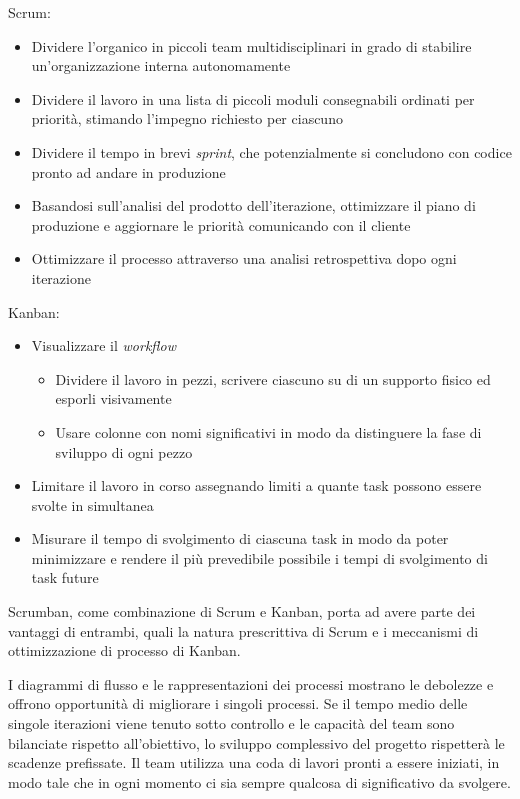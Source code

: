 \begin{multicols}{2}
Scrum:\\
\begin{itemize}
\item
Dividere l'organico in piccoli team multidisciplinari in grado di stabilire un'organizzazione interna autonomamente
\item
Dividere il lavoro in una lista di piccoli moduli consegnabili ordinati per priorità, stimando l'impegno richiesto per ciascuno
\item
Dividere il tempo in brevi \textit{sprint}, che potenzialmente si concludono con codice pronto ad andare in produzione
\item
Basandosi sull'analisi del prodotto dell'iterazione, ottimizzare il piano di produzione e aggiornare le priorità comunicando con il cliente
\item
Ottimizzare il processo attraverso una analisi retrospettiva dopo ogni iterazione
\end{itemize}
\columnbreak
Kanban:
\begin{itemize}
\item
Visualizzare il \textit{workflow}
\begin{itemize}
\item
Dividere il lavoro in pezzi, scrivere ciascuno su di un supporto fisico ed esporli visivamente
\item
Usare colonne con nomi significativi in modo da distinguere la fase di sviluppo di ogni pezzo
\end{itemize}
\item
Limitare il lavoro in corso assegnando limiti a quante task possono essere svolte in simultanea
\item
Misurare il tempo di svolgimento di ciascuna task in modo da poter minimizzare e rendere il più prevedibile possibile i tempi di svolgimento di task future
\end{itemize}
\end{multicols}

Scrumban, come combinazione di Scrum e Kanban, porta ad avere parte dei vantaggi di entrambi, quali la natura prescrittiva di Scrum e i meccanismi di ottimizzazione di processo di Kanban.

I diagrammi di flusso e le rappresentazioni dei processi mostrano le debolezze e offrono opportunità di migliorare i singoli processi.
Se il tempo medio delle singole iterazioni viene tenuto sotto controllo e le capacità del team sono bilanciate rispetto all'obiettivo, lo sviluppo complessivo del progetto rispetterà le scadenze prefissate.
Il team utilizza una coda di lavori pronti a essere iniziati, in modo tale che in ogni momento ci sia sempre qualcosa di significativo da svolgere. \cite{SCRUMBAN}
